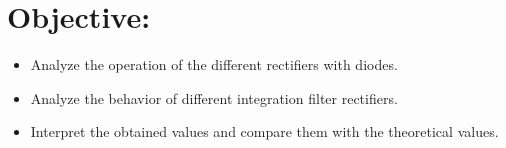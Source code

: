 \section{Objective:}

\begin{itemize}
\item Analyze the operation of the different rectifiers with diodes.
\item Analyze the behavior of different integration filter rectifiers.
\item Interpret the obtained values and compare them with the theoretical values.
\end{itemize}

\pagebreak
